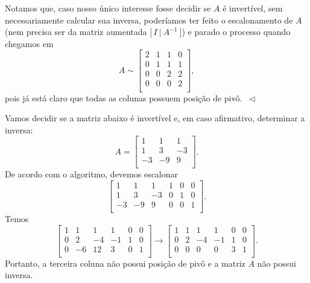 \begin{ex}
	Notamos que, caso nosso único interesse fosse decidir se $A$ é invertível, sem necessariamente calcular sua inversa, poderíamos ter feito o escalonamento de $A$ (nem precisa ser da matriz aumentada $\big[ \, I \ | \ A^{-1} \ \big]$) e parado o processo quando chegamos em
	\begin{equation}
	A \sim \left[
	\begin{array}{cccc}
	2 & 1 & 1 & 0 \\
	0 & 1 & 1 & 1 \\
	0 & 0 & 2 & 2 \\
	0 & 0 & 0 & 2 \\
	\end{array}
	\right],
	\end{equation} pois já está claro que todas as colunas possuem posição de pivô. $\ \lhd$
\end{ex}



\begin{ex}
	Vamos decidir se a matriz abaixo é invertível e, em caso afirmativo, determinar a inversa:
	\begin{equation}
	A =
	\left[
	\begin{array}{cccc}
	1 & 1 & 1  \\
	1 & 3 & -3  \\
	-3 & -9 & 9  \\
	\end{array}
	\right].
	\end{equation} De acordo com o algoritmo, devemos escalonar
	\begin{equation}
	\left[
	\begin{array}{ccc|ccc}
	1 & 1 & 1 & 1 & 0 & 0  \\
	1 & 3 & -3 & 0 & 1 & 0  \\
	-3 & -9 & 9  & 0 & 0 & 1 \\
	\end{array}
	\right].
	\end{equation} Temos
	\begin{equation}
	\left[
	\begin{array}{ccc|ccc}
	1 & 1 & 1 & 1 & 0 & 0  \\
	0 & 2 & -4 & -1 & 1 & 0  \\
	0 & -6 & 12  & 3 & 0 & 1 \\
	\end{array}
	\right] \to
	\left[
	\begin{array}{ccc|ccc}
	1 & 1 & 1 & 1 & 0 & 0  \\
	0 & 2 & -4 & -1 & 1 & 0  \\
	0 & 0 & 0  & 0 & 3 & 1 \\
	\end{array}
	\right].
	\end{equation} Portanto, a terceira coluna não possui posição de pivô e a matriz $A$ não possui inversa.
\end{ex}


